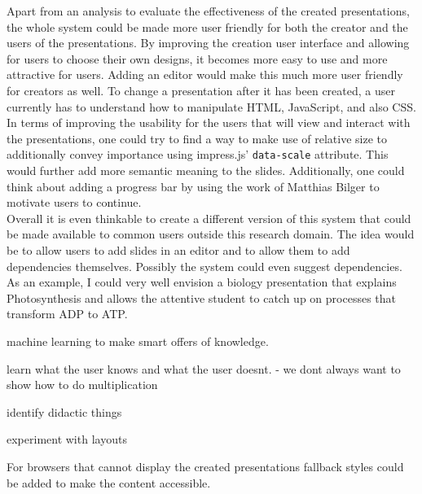 \documentclass[twoside, 12pt]{article}
\begin{document}
Apart from an analysis to evaluate the effectiveness of the created presentations, the whole system could be made more user friendly for both the creator and the users of the presentations. By improving the creation user interface and allowing for users to choose their own designs, it becomes more easy to use and more attractive for users. Adding an editor would make this much more user friendly for creators as well. To change a presentation after it has been created, a user currently has to understand how to manipulate HTML, JavaScript, and also CSS.\\

In terms of improving the usability for the users that will view and interact with the presentations, one could try to find a way to make use of relative size to additionally convey importance using impress.js' \texttt{data-scale} attribute. This would further add more semantic meaning to the slides. Additionally, one could think about adding a progress bar by using the work of Matthias Bilger \cite{bilger:npentrel15} to motivate users to continue.\\

Overall it is even thinkable to create a different version of this system that could be made available to common users outside this research domain. The idea would be to allow users to add slides in an editor and to allow them to add dependencies themselves. Possibly the system could even suggest dependencies. As an example, I could very well envision a biology presentation that explains Photosynthesis and allows the attentive student to catch up on processes that transform ADP to ATP.\\


machine learning to make smart offers of knowledge. 

learn what the user knows and what the user doesnt. - we dont always want to show how to do multiplication

identify didactic things

experiment with layouts


For browsers that cannot display the created presentations fallback styles could be added to make the content accessible.
\end{document}
